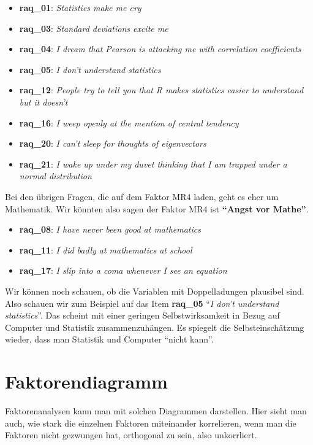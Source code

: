\documentclass[
  10pt,
  letterpaper,
  a4paper, twoside]{scrreprt}
\providecommand{\tightlist}{%
  \setlength{\itemsep}{0pt}\setlength{\parskip}{0pt}}\usepackage{longtable,booktabs,array}
\begin{document}
\begin{itemize}
\tightlist
\item
  \textbf{raq\_01}: \emph{Statistics make me cry}
\item
  \textbf{raq\_03}: \emph{Standard deviations excite me}
\item
  \textbf{raq\_04}: \emph{I dream that Pearson is attacking me with
  correlation coefficients}
\item
  \textbf{raq\_05}: \emph{I don't understand statistics}
\item
  \textbf{raq\_12}: \emph{People try to tell you that R makes statistics
  easier to understand but it doesn't}
\item
  \textbf{raq\_16}: \emph{I weep openly at the mention of central
  tendency}
\item
  \textbf{raq\_20}: \emph{I can't sleep for thoughts of eigenvectors}
\item
  \textbf{raq\_21}: \emph{I wake up under my duvet thinking that I am
  trapped under a normal distribution}
\end{itemize}

Bei den übrigen Fragen, die auf dem Faktor MR4 laden, geht es eher um
Mathematik. Wir könnten also sagen der Faktor MR4 ist
\textbf{\enquote{Angst vor Mathe}}.

\begin{itemize}
\tightlist
\item
  \textbf{raq\_08}: \emph{I have never been good at mathematics}
\item
  \textbf{raq\_11}: \emph{I did badly at mathematics at school}
\item
  \textbf{raq\_17}: \emph{I slip into a coma whenever I see an equation}
\end{itemize}

Wir können noch schauen, ob die Variablen mit Doppelladungen plausibel
sind. Also schauen wir zum Beispiel auf das Item \textbf{raq\_05}
\enquote{\emph{I don't understand statistics}}. Das scheint mit einer
geringen Selbstwirksamkeit in Bezug auf Computer und Statistik
zusammenzuhängen. Es spiegelt die Selbsteinschätzung wieder, dass man
Statistik und Computer \enquote{nicht kann}.

\section{Faktorendiagramm}\label{faktorendiagramm}

Faktorenanalysen kann man mit solchen Diagrammen darstellen. Hier sieht
man auch, wie stark die einzelnen Faktoren miteinander korrelieren, wenn
man die Faktoren nicht gezwungen hat, orthogonal zu sein, also
unkorrliert.
\end{document}
